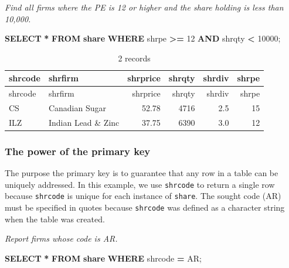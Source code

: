 \documentclass[
]{article}
\newenvironment{Shaded}{\begin{snugshade}}{\end{snugshade}}
\newcommand{\DecValTok}[1]{\textcolor[rgb]{0.00,0.00,0.81}{#1}}
\newcommand{\KeywordTok}[1]{\textcolor[rgb]{0.13,0.29,0.53}{\textbf{#1}}}
\newcommand{\NormalTok}[1]{#1}
\newcommand{\OperatorTok}[1]{\textcolor[rgb]{0.81,0.36,0.00}{\textbf{#1}}}
\newcommand{\StringTok}[1]{\textcolor[rgb]{0.31,0.60,0.02}{#1}}
\begin{document}
\emph{Find all firms where the PE is 12 or higher and the share holding
is less than 10,000.}

\begin{Shaded}
\begin{Highlighting}[]
\KeywordTok{SELECT} \OperatorTok{*} \KeywordTok{FROM} \KeywordTok{share}
  \KeywordTok{WHERE}\NormalTok{ shrpe }\OperatorTok{\textgreater{}=} \DecValTok{12} \KeywordTok{AND}\NormalTok{ shrqty }\OperatorTok{\textless{}} \DecValTok{10000}\NormalTok{;}
\end{Highlighting}
\end{Shaded}

\begin{longtable}[]{@{}llrrrr@{}}
\caption{2 records}\tabularnewline
\toprule()
shrcode & shrfirm & shrprice & shrqty & shrdiv & shrpe \\
\midrule()
\endfirsthead
\toprule()
shrcode & shrfirm & shrprice & shrqty & shrdiv & shrpe \\
\midrule()
\endhead
CS & Canadian Sugar & 52.78 & 4716 & 2.5 & 15 \\
ILZ & Indian Lead \& Zinc & 37.75 & 6390 & 3.0 & 12 \\
\bottomrule()
\end{longtable}

\hypertarget{the-power-of-the-primary-key}{%
\subsubsection{The power of the primary
key}\label{the-power-of-the-primary-key}}

The purpose the primary key is to guarantee that any row in a table can
be uniquely addressed. In this example, we use \texttt{shrcode} to
return a single row because \texttt{shrcode} is unique for each instance
of \texttt{share}. The sought code (AR) must be specified in quotes
because \texttt{shrcode} was defined as a character string when the
table was created.

\emph{Report firms whose code is AR.}

\begin{Shaded}
\begin{Highlighting}[]
\KeywordTok{SELECT} \OperatorTok{*} \KeywordTok{FROM} \KeywordTok{share} \KeywordTok{WHERE}\NormalTok{ shrcode }\OperatorTok{=} \StringTok{\textquotesingle{}AR\textquotesingle{}}\NormalTok{;}
\end{Highlighting}
\end{Shaded}
\end{document}
